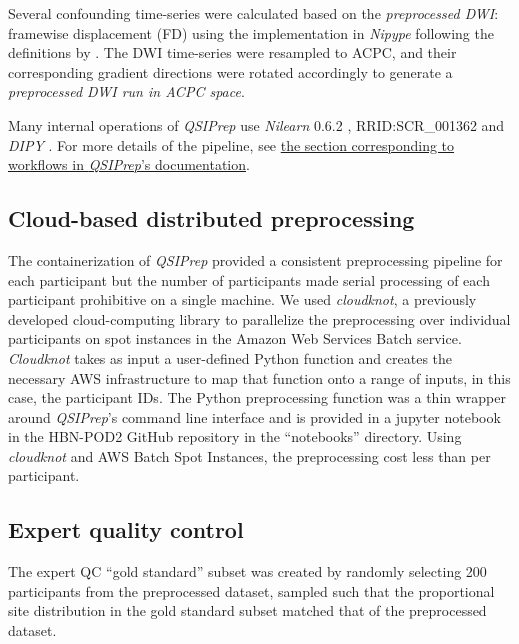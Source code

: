 \documentclass[9pt,lineno]{elife}
\begin{document}
\begin{itemize}
Several confounding time-series were calculated based on the
\emph{preprocessed DWI}: framewise displacement (FD) using the implementation
in \emph{Nipype} following the definitions by \citep{power-fd-dvars}. The DWI
time-series were resampled to ACPC, and their corresponding gradient directions
were rotated accordingly to generate a \emph{preprocessed DWI run
in ACPC space}. 

\end{itemize}

Many internal operations of \emph{QSIPrep} use \emph{Nilearn} 0.6.2
\citep{nilearn}, RRID:SCR\_001362 and \emph{DIPY} \citep{dipy}. For more details
of the pipeline, see
\href{https://qsiprep.readthedocs.io/en/latest/workflows.html}{the section
corresponding to workflows in \emph{QSIPrep}'s documentation}.

\subsection{Cloud-based distributed preprocessing}

The containerization of \emph{QSIPrep} provided a consistent preprocessing
pipeline for each participant but the number of participants made serial processing of
each participant prohibitive on a single machine. We used \emph{cloudknot}, a
previously developed cloud-computing library \citep{cloudknot} to
parallelize the preprocessing over individual participants on spot instances in the
Amazon Web Services Batch service. \emph{Cloudknot} takes as input a
user-defined Python function and creates the necessary AWS infrastructure to map
that function onto a range of inputs, in this case, the participant IDs. The Python
preprocessing function was a thin wrapper around \emph{QSIPrep}'s command line
interface and is provided in a jupyter notebook in the HBN-POD2 GitHub
repository in the ``notebooks'' directory. Using \emph{cloudknot} and AWS Batch
Spot Instances, the preprocessing cost less than  per participant.

\subsection{Expert quality control}

The expert QC ``gold standard'' subset was created by randomly selecting 200
participants from the preprocessed dataset, sampled such that the proportional site
distribution in the gold standard subset matched that of the preprocessed
dataset.
\end{document}

